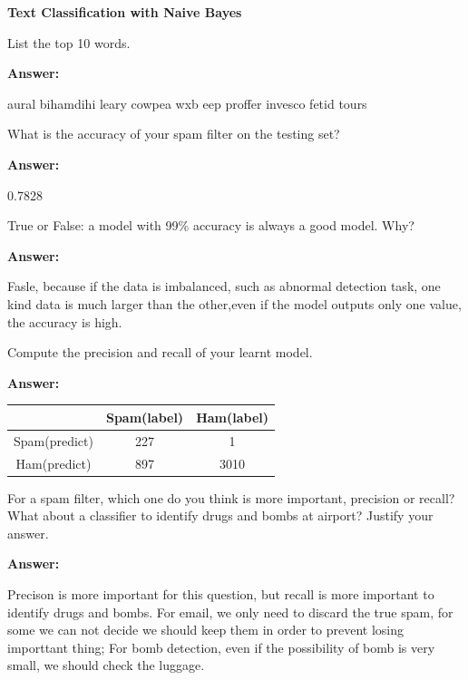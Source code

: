 \documentclass[12pt,twoside]{article}
\newcommand{\answer}{
 \par\medskip
 \textbf{Answer:}
}
\newcommand{\answerIIIIa}{ \answer
aural bihamdihi leary cowpea wxb eep proffer invesco fetid tours
}
\newcommand{\answerIIIIb}{ \answer
0.7828
}
\newcommand{\answerIIIIc}{ \answer
Fasle, because if the data is imbalanced, such as abnormal detection task, one kind data is much larger than the other,even if the model outputs only one value, the accuracy is high.
}
\newcommand{\answerIIIId}{ \answer
\begin{tabular}{|c|c|c|}%
	 \hline  %
	 &Spam(label)&Ham(label) \\
	 \hline
	Spam(predict)&227&1\\
	\hline  %
	Ham(predict)&897&3010\\
	\hline %
\end{tabular}

}
\newcommand{\answerIIIIe}{ \answer
Precison is more important for this question, but recall is more important to identify drugs and bombs.
For email, we only need to discard the true spam, for some we can not decide we should keep them in order to prevent losing importtant thing;
For bomb detection, even if the possibility of bomb is very small, we should check the luggage.   
}
\begin{document}
\begin{problems}
\newpage

\problem  \textbf{Text Classification with Naive Bayes}

\begin{problemparts}
\problempart  List the top 10 words.

\answerIIIIa

\problempart What is the accuracy of your spam filter on the testing set?
\answerIIIIb

\problempart True or False: a model with 99\% accuracy is always a good model. Why?
\answerIIIIc

\problempart Compute the precision and recall of your learnt model.
\answerIIIId 

\problempart For a spam filter, which one do you think is more important, precision or recall? What about a classifier to identify drugs and bombs at airport? Justify your answer.
\answerIIIIe 

\end{problemparts}

\end{problems}
\end{document}
